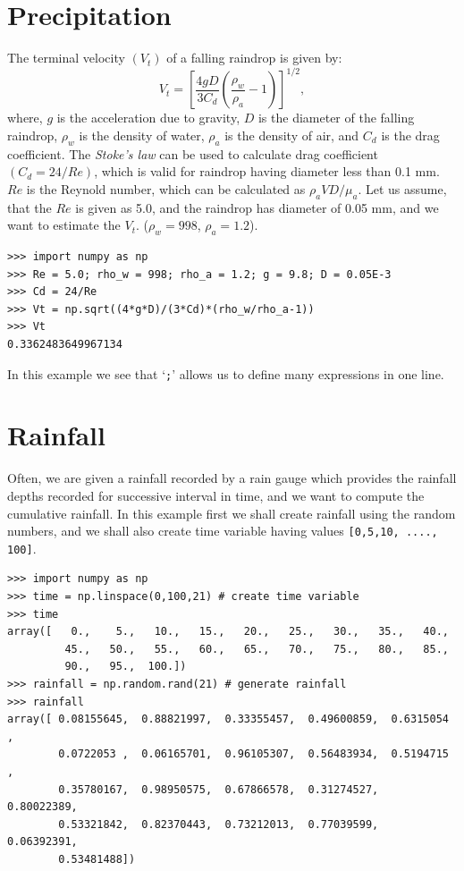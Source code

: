 \documentclass[10pt]{book}
\begin{document}
{\section{Precipitation}
The terminal velocity $(V_t)$ of a falling raindrop is given by:
\begin{equation}
V_t = \left[\frac{4gD}{3C_d}\left( \frac{\rho_w}{\rho_a}-1\right) \right]^{1/2},
\end{equation}
where, $g$ is the acceleration due to gravity, $D$ is the diameter of the falling raindrop, $\rho_w$ is the density of water, $\rho_a$ is the density of air, and $C_d$ is the drag coefficient. The \emph{Stoke's law} can be used to calculate drag coefficient $(C_d = 24/Re)$, which is valid for raindrop having diameter less than 0.1 mm. $Re$ is the Reynold number, which can be calculated as $\rho_a VD/\mu_a$. Let us assume, that the $Re$ is given as 5.0, and the raindrop has diameter of 0.05 mm, and we want to estimate the $V_t$. ($\rho_w = 998$, $\rho_a=1.2$).
\beforeverb
\begin{verbatim}
>>> import numpy as np
>>> Re = 5.0; rho_w = 998; rho_a = 1.2; g = 9.8; D = 0.05E-3
>>> Cd = 24/Re
>>> Vt = np.sqrt((4*g*D)/(3*Cd)*(rho_w/rho_a-1))
>>> Vt
0.3362483649967134
\end{verbatim}
\afterverb
In this example we see that `\verb";"' allows us to define many expressions in one line.

\section{Rainfall}
Often, we are given a rainfall recorded by a rain gauge which provides the rainfall depths recorded for successive interval in time, and we want to compute the cumulative rainfall. In this example first we shall create rainfall using the random numbers, and we shall also create time variable having values \verb"[0,5,10, ...., 100]". 
\beforeverb \begin{verbatim}
>>> import numpy as np
>>> time = np.linspace(0,100,21) # create time variable
>>> time
array([   0.,    5.,   10.,   15.,   20.,   25.,   30.,   35.,   40.,
         45.,   50.,   55.,   60.,   65.,   70.,   75.,   80.,   85.,
         90.,   95.,  100.])
>>> rainfall = np.random.rand(21) # generate rainfall
>>> rainfall
array([ 0.08155645,  0.88821997,  0.33355457,  0.49600859,  0.6315054 ,
        0.0722053 ,  0.06165701,  0.96105307,  0.56483934,  0.5194715 ,
        0.35780167,  0.98950575,  0.67866578,  0.31274527,  0.80022389,
        0.53321842,  0.82370443,  0.73212013,  0.77039599,  0.06392391,
        0.53481488])
\end{verbatim} \afterverb

}
\end{document}
